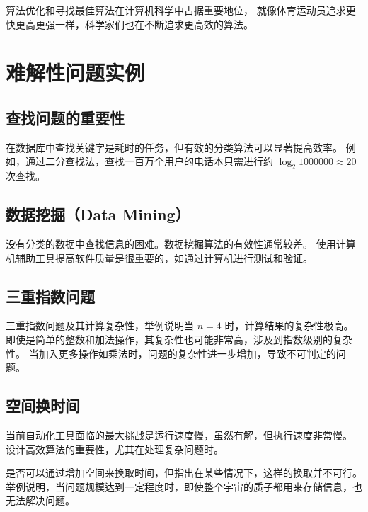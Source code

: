\documentclass[UTF-8,a4paper,9pt]{article}
\begin{document}
算法优化和寻找最佳算法在计算机科学中占据重要地位，
就像体育运动员追求更快更高更强一样，科学家们也在不断追求更高效的算法。

\section{难解性问题实例}

\subsection{查找问题的重要性}

在数据库中查找关键字是耗时的任务，但有效的分类算法可以显著提高效率。
例如，通过二分查找法，查找一百万个用户的电话本只需进行约 $\log_2{1000000} \approx 20$ 次查找。

\begin{center}
\end{center}

\subsection{数据挖掘（Data Mining）}

没有分类的数据中查找信息的困难。数据挖掘算法的有效性通常较差。
使用计算机辅助工具提高软件质量是很重要的，如通过计算机进行测试和验证。

\subsection{三重指数问题}

三重指数问题及其计算复杂性，举例说明当 $n=4$ 时，计算结果的复杂性极高。
即使是简单的整数和加法操作，其复杂性也可能非常高，涉及到指数级别的复杂性。
当加入更多操作如乘法时，问题的复杂性进一步增加，导致不可判定的问题。

\subsection{空间换时间}

当前自动化工具面临的最大挑战是运行速度慢，虽然有解，但执行速度非常慢。
设计高效算法的重要性，尤其在处理复杂问题时。

是否可以通过增加空间来换取时间，但指出在某些情况下，这样的换取并不可行。
举例说明，当问题规模达到一定程度时，即使整个宇宙的质子都用来存储信息，也无法解决问题。
\end{document}
